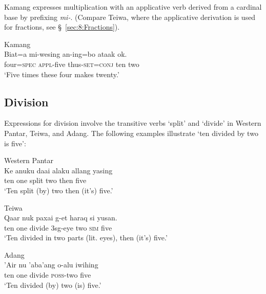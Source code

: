  

Kamang expresses multiplication with an applicative verb derived from a cardinal base by prefixing \textit{mi-}. (Compare Teiwa, where the applicative derivation is used for fractions, see {\S}~\ref{sec:8:Fractions}). 




\ea%
\label{bkm:Ref358043179}
{\upshape Kamang}\\
\gll   Biat=a  mi-wesing  an-ing=bo  ataak   ok.  \\  
    four=\textsc{spec}  \textsc{appl-}five  thus\textsc{-set}=\textsc{conj} ten  two   \\
\glt  `Five times these four makes twenty.'
\z


\subsection{Division}
\label{sec:8:Division}
Expressions for division involve the transitive verbs `split' and `divide' in Western Pantar, Teiwa, and Adang. The following examples illustrate `ten divided by two is five': 


\ea%
\label{bkm:Ref342664493}
{\upshape Western  Pantar}\\
 
\gll   Ke anuku  daai  alaku  allang  yasing\\  
    ten one  split  two  then  five \\
\glt `Ten split (by) two then (it's) five.'
\z



 

 


\ea
\label{ex:8:1246}
{\upshape Teiwa}\\  
 \gll Qaar  nuk  paxai  g-et  haraq  si  yusan.   \\
  ten  one  divide  3sg-eye  two  \textsc{sim}  five   \\
 \glt `Ten divided in two parts (lit. eyes), then (it's) five.'
\z
 

\ea%
\label{bkm:Ref342664505}
{\upshape Adang}\\
\gll  'Air nu  'aba'ang  {\textglotstop}o-alu  iwihing\\  
    ten one  divide  \textsc{poss-}two  five \\
\glt `Ten divided (by) two (is) five.'  
\z

 

